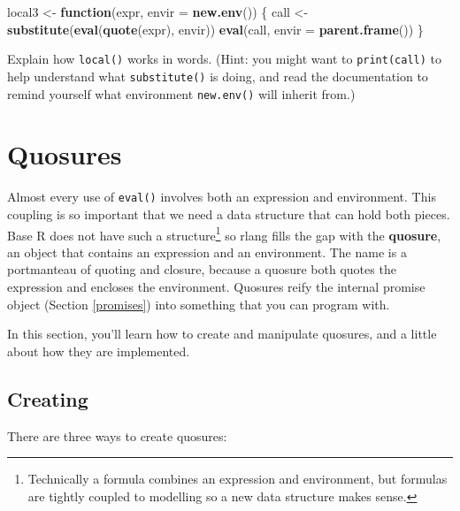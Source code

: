 \documentclass[]{book}
\newenvironment{Shaded}{\begin{snugshade}}{\end{snugshade}}
\newcommand{\ControlFlowTok}[1]{\textcolor[rgb]{0.27,0.27,0.27}{\textbf{#1}}}
\newcommand{\DataTypeTok}[1]{\textcolor[rgb]{0.27,0.27,0.27}{#1}}
\newcommand{\KeywordTok}[1]{\textcolor[rgb]{0.27,0.27,0.27}{\textbf{#1}}}
\newcommand{\NormalTok}[1]{#1}
\newcommand{\StringTok}[1]{\textcolor[rgb]{0.5,0.5,0.5}{#1}}
\let\rmarkdownfootnote\footnote%
\def\footnote{\protect\rmarkdownfootnote}
\begin{document}
\begin{enumerate}
\begin{Shaded}
\begin{Highlighting}[]
\NormalTok{local3 <-}\StringTok{ }\ControlFlowTok{function}\NormalTok{(expr, }\DataTypeTok{envir =} \KeywordTok{new.env}\NormalTok{()) \{}
\NormalTok{  call <-}\StringTok{ }\KeywordTok{substitute}\NormalTok{(}\KeywordTok{eval}\NormalTok{(}\KeywordTok{quote}\NormalTok{(expr), envir))}
  \KeywordTok{eval}\NormalTok{(call, }\DataTypeTok{envir =} \KeywordTok{parent.frame}\NormalTok{())}
\NormalTok{\}}
\end{Highlighting}
\end{Shaded}

  Explain how \texttt{local()} works in words. (Hint: you might want to \texttt{print(call)}
  to help understand what \texttt{substitute()} is doing, and read the documentation
  to remind yourself what environment \texttt{new.env()} will inherit from.)
\end{enumerate}

\hypertarget{quosures}{%
\section{Quosures}\label{quosures}}


Almost every use of \texttt{eval()} involves both an expression and environment. This coupling is so important that we need a data structure that can hold both pieces. Base R does not have such a structure\footnote{Technically a formula combines an expression and environment, but formulas are tightly coupled to modelling so a new data structure makes sense.} so rlang fills the gap with the \textbf{quosure}, an object that contains an expression and an environment. The name is a portmanteau of quoting and closure, because a quosure both quotes the expression and encloses the environment. Quosures reify the internal promise object (Section \ref{promises}) into something that you can program with.

In this section, you'll learn how to create and manipulate quosures, and a little about how they are implemented.

\hypertarget{creating}{%
\subsection{Creating}\label{creating}}


There are three ways to create quosures:
\end{document}
